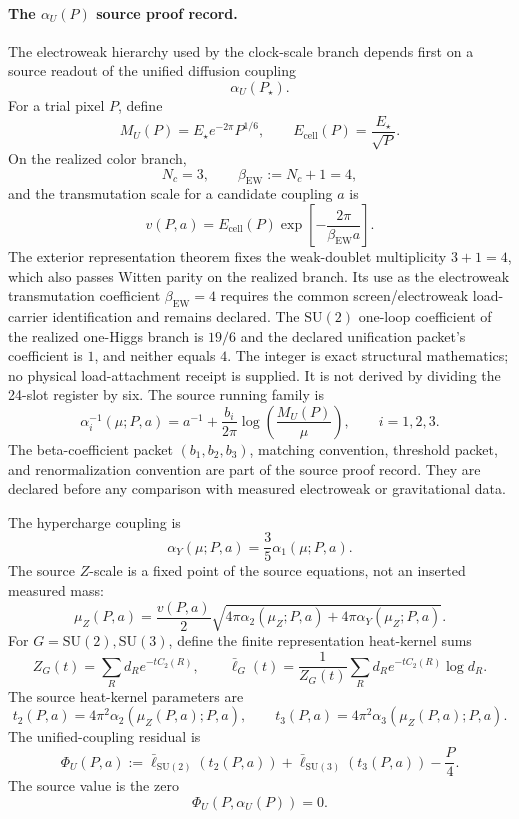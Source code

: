 \paragraph{The \(\alpha_U(P)\) source proof record.}
The electroweak hierarchy used by the clock-scale branch depends first on a source readout of the
unified diffusion coupling
\[
\alpha_U(P_\star).
\]
For a trial pixel \(P\), define
\[
M_U(P)=E_\star e^{-2\pi}P^{1/6},
\qquad
E_{\mathrm{cell}}(P)=\frac{E_\star}{\sqrt P}.
\]
On the realized color branch,
\[
N_c=3,
\qquad
\beta_{\mathrm{EW}}:=N_c+1=4,
\]
and the transmutation scale for a candidate coupling \(a\) is
\[
v(P,a)
=
E_{\mathrm{cell}}(P)
\exp\!\left[
-\frac{2\pi}{\beta_{\mathrm{EW}}a}
\right].
\]
The exterior representation theorem fixes the weak-doublet multiplicity
\(3+1=4\), which also passes Witten parity on the realized branch. Its use as
the electroweak transmutation coefficient \(\beta_{\mathrm{EW}}=4\) requires the
common screen/electroweak load-carrier identification and remains declared.
The \(\mathrm{SU}(2)\) one-loop coefficient of the realized one-Higgs branch
is \(19/6\) and the declared unification packet's coefficient is \(1\), and neither equals \(4\).
The integer is exact structural mathematics; no physical load-attachment
receipt is supplied. It is not derived by dividing the 24-slot register by six.
The source running family is
\[
\alpha_i^{-1}(\mu;P,a)
=
a^{-1}
+
\frac{b_i}{2\pi}
\log\!\left(\frac{M_U(P)}{\mu}\right),
\qquad i=1,2,3.
\]
The beta-coefficient packet \((b_1,b_2,b_3)\), matching convention, threshold packet, and
renormalization convention are part of the source proof record. They are declared before any
comparison with measured electroweak or gravitational data.

The hypercharge coupling is
\[
\alpha_Y(\mu;P,a)=\frac35\alpha_1(\mu;P,a).
\]
The source \(Z\)-scale is a fixed point of the source equations, not an inserted measured mass:
\[
\mu_Z(P,a)
=
\frac{v(P,a)}{2}
\sqrt{
4\pi\alpha_2(\mu_Z;P,a)
+
4\pi\alpha_Y(\mu_Z;P,a)
}.
\]
For \(G=\mathrm{SU}(2),\mathrm{SU}(3)\), define the finite representation heat-kernel sums
\[
Z_G(t)=\sum_R d_R e^{-tC_2(R)},
\qquad
\bar\ell_G(t)
=
\frac{1}{Z_G(t)}
\sum_R d_R e^{-tC_2(R)}\log d_R.
\]
The source heat-kernel parameters are
\[
t_2(P,a)=4\pi^2\alpha_2(\mu_Z(P,a);P,a),
\qquad
t_3(P,a)=4\pi^2\alpha_3(\mu_Z(P,a);P,a).
\]
The unified-coupling residual is
\[
\Phi_U(P,a)
:=
\bar\ell_{\mathrm{SU}(2)}(t_2(P,a))
+
\bar\ell_{\mathrm{SU}(3)}(t_3(P,a))
-
\frac{P}{4}.
\]
The source value is the zero
\[
\Phi_U(P,\alpha_U(P))=0.
\]

